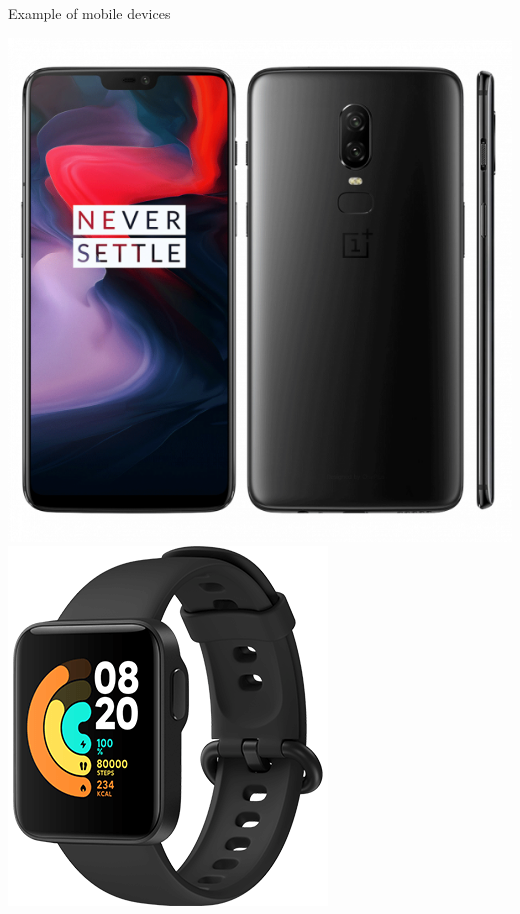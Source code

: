 \documentclass[dvipsnames, handout]{beamer}
\newcommand{\1}{\mathds{1}}	%
\begin{document}
\begin{frame}{Example of mobile devices}
\begin{center}
\includegraphics[scale=0.2]{presentation/one_plus.png}
\includegraphics[scale=0.2]{presentation/watch.png}  

\end{center}
\end{frame}
\end{document}
